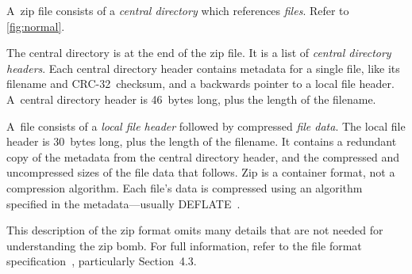 \documentclass[letterpaper,twocolumn,10pt]{article}
\newcommand{\CRC}{\mbox{CRC-32}}
\begin{document}
A~zip file consists of
a \emph{central directory} which references
\emph{files}.
Refer to \autoref{fig:normal}.

The central directory is at the end of the zip file.
It is a list of \emph{central directory headers}.
Each central directory header contains metadata for a single file,
like its filename and \CRC\ checksum,
and a backwards pointer to a local file header.
A~central directory header is \SI{46}{bytes} long,
plus the length of the filename.

A~file consists of a \emph{local file header}
followed by compressed \emph{file data}.
The local file header is \SI{30}{bytes} long,
plus the length of the filename.
It contains a redundant copy
of the metadata from the central directory header,
and the compressed and uncompressed sizes of the file data
that follows.
Zip is a container format, not a compression algorithm.
Each file's data is compressed
using an algorithm specified in the metadata---usually DEFLATE~\cite{rfc1951}.

This description of the zip format omits many details that
are not needed for understanding the zip bomb.
For full information,
refer to the file format specification~\cite{appnote},
particularly Section~4.3.
\end{document}
